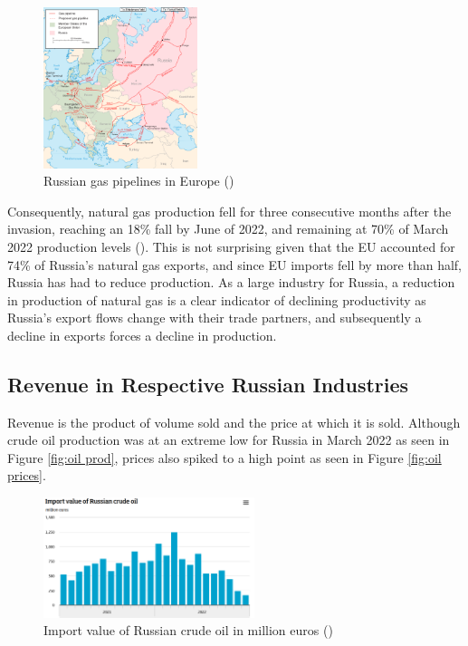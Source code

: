 \documentclass[12pt]{article}
\begin{document}
\begin{figure}[h]
    \centering
    \includegraphics[width=0.4\textwidth]{images/pipelines.png}
    \caption{Russian gas pipelines in Europe (\citeauthor{conca_2014})}
    \label{fig:pipelines}
\end{figure}

\vspace{-5mm}

Consequently, natural gas production fell for three consecutive months after the invasion, reaching an 18\% fall by June of 2022, and remaining at 70\% of March 2022 production levels (\citeauthor{ief_2022}). This is not surprising given that the EU accounted for 74\% of Russia's natural gas exports, and since EU imports fell by more than half, Russia has had to reduce production. As a large industry for Russia, a reduction in production of natural gas is a clear indicator of declining productivity as Russia's export flows change with their trade partners, and subsequently a decline in exports forces a decline in production. 

\subsection{Revenue in Respective Russian Industries}

Revenue is the product of volume sold and the price at which it is sold. Although crude oil production was at an extreme low for Russia in March 2022 as seen in Figure \ref{fig:oil prod}, prices also spiked to a high point as seen in Figure \ref{fig:oil prices}. 

\begin{figure}[h]
    \centering
    \includegraphics[width=0.55\textwidth]{images/import value.png}
    \caption{Import value of Russian crude oil in million euros (\citeauthor{})}
    \label{fig:import value}
\end{figure}
\end{document}
